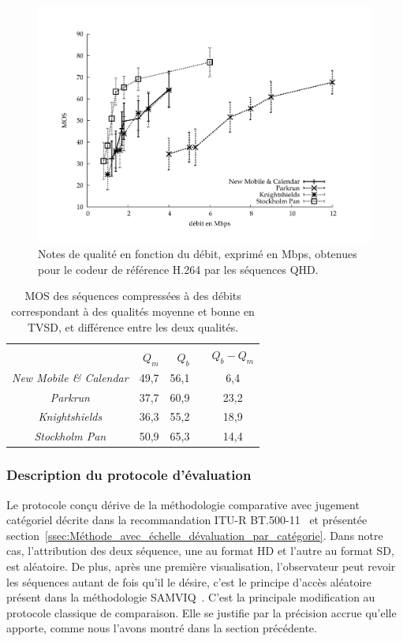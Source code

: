 \begin{figure}[htbp]
\centering
\includegraphics[page=1, width=0.9\linewidth, trim= 70 50 90 70]{plot/debit-mosSD}
\caption{Notes de qualité en fonction du débit, exprimé en Mbps, obtenues pour le codeur de référence H.264 par les séquences QHD.}
\label{fig:MOSrateCodeurRefSD}
\end{figure}

\begin{table}[htbp]
\centering
\begin{tabular}{cDDp{0.1cm}c} \toprule
{} &  & & \tabularnewline
{}
 & $Q_m$ & $Q_b$ & \tabularnewline \toprule
\emph{New Mobile \& Calendar}	& 49,7 & 56,1 & & 6,4\tabularnewline \midrule
\emph{Parkrun}							& 37,7 & 60,9 & & 23,2\tabularnewline \midrule
\emph{Knightshields}					& 36,3 & 55,2 & & 18,9\tabularnewline \midrule
\emph{Stockholm Pan}				& 50,9 & 65,3 & & 14,4\tabularnewline \bottomrule
\end{tabular}
\caption{MOS des séquences compressées à des débits correspondant à des qualités moyenne et bonne en TVSD, et différence entre les deux qualités.}
\label{tab:bitratesSDQ60Q80}
\end{table}


\subsubsection{Description du protocole d'évaluation}
Le protocole conçu dérive de la méthodologie comparative avec jugement catégoriel décrite dans la recommandation ITU-R BT.500-11~\cite{itu-bt500-11} et présentée section~\ref{ssec:Méthode_avec_échelle_dévaluation_par_catégorie}. Dans notre cas, l'attribution des deux séquence, une au format HD et l'autre au format SD, est aléatoire. De plus, après une première visualisation, l'observateur peut revoir les séquences autant de fois qu'il le désire, c'est le principe d'accès aléatoire présent dans la méthodologie SAMVIQ~\cite{ebu-samviq}. C'est la principale modification au protocole classique de comparaison. Elle se justifie par la précision accrue qu'elle apporte, comme nous l'avons montré dans la section précédente.

